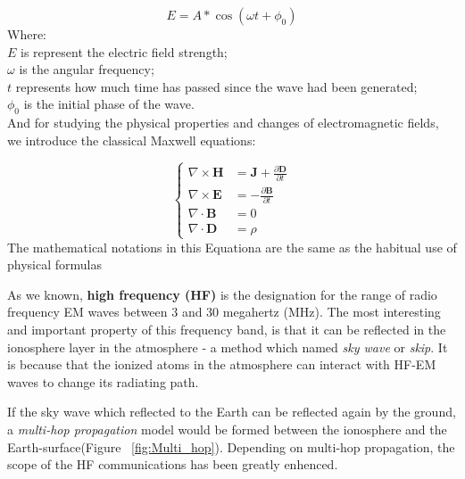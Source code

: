 \documentclass{mcmthesis}
\begin{document}
      \begin{equation}\label{eq:EMW}
        E = A * \cos(\omega t + \phi_{0})
      \end{equation}
      Where: \\
      $E$ is represent the electric field strength; \\
      $\omega$ is the angular frequency;\\
      $t$ represents how much time has passed since the wave had been generated;\\
      $\phi_{0}$ is the initial phase of the wave.\\

      And for studying the physical properties and changes of electromagnetic fields, we introduce the classical Maxwell equations:


      \begin{equation}\label{eq:Maxwell_new}
      \left\{
      \begin{aligned} %
          \nabla \times \textbf{H}  &= \textbf{J} + \frac{\partial\textbf{D}}{\partial t}       \\
          \nabla \times \textbf{E}  &= -\frac{\partial\textbf{B}}{\partial t}       \\
          \nabla   \cdot  \textbf{B}  &= 0       \\
          \nabla   \cdot  \textbf{D}  &= \rho
      \end{aligned}
      \right.
      \end{equation}
      The mathematical notations in this Equationa are the same as the habitual use of physical formulas


      As we known, \textbf{high frequency (HF)} is the designation for the range of radio frequency EM waves between 3 and 30 megahertz (MHz). The most interesting and important property of this frequency band, is that it can be reflected in the ionosphere layer in the atmosphere - a method which named \emph{sky wave} or \emph{skip}. It is because that the ionized atoms in the atmosphere can interact with HF-EM waves to change its radiating path.\cite{HF_EM}

      If the sky wave which reflected to the Earth can be reflected again by the ground, a \emph{multi-hop propagation} model would be formed between the ionosphere and the Earth-surface(Figure ~\ref{fig:Multi_hop}). Depending on multi-hop propagation, the scope of the HF communications has been greatly enhenced.
\end{document}
